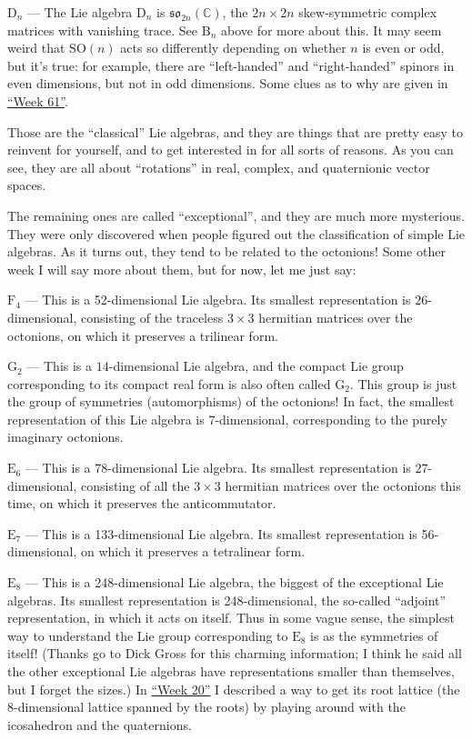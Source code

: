 \documentclass{article}
\begin{document}
\(\mathrm{D}_n\) --- The Lie algebra \(\mathrm{D}_n\) is
\(\mathfrak{so}_{2n}(\mathbb{C})\), the \(2n \times 2n\) skew-symmetric
complex matrices with vanishing trace. See \(\mathrm{B}_n\) above for
more about this. It may seem weird that \(\mathrm{SO}(n)\) acts so
differently depending on whether \(n\) is even or odd, but it's true:
for example, there are ``left-handed'' and ``right-handed'' spinors in
even dimensions, but not in odd dimensions. Some clues as to why are
given in \protect\hyperlink{week61}{``Week 61''}.

Those are the ``classical'' Lie algebras, and they are things that are
pretty easy to reinvent for yourself, and to get interested in for all
sorts of reasons. As you can see, they are all about ``rotations'' in
real, complex, and quaternionic vector spaces.

The remaining ones are called ``exceptional'', and they are much more
mysterious. They were only discovered when people figured out the
classification of simple Lie algebras. As it turns out, they tend to be
related to the octonions! Some other week I will say more about them,
but for now, let me just say:

\(\mathrm{F}_4\) --- This is a 52-dimensional Lie algebra. Its smallest
representation is \(26\)-dimensional, consisting of the traceless
\(3\times3\) hermitian matrices over the octonions, on which it
preserves a trilinear form.

\(\mathrm{G}_2\) --- This is a \(14\)-dimensional Lie algebra, and the
compact Lie group corresponding to its compact real form is also often
called \(\mathrm{G}_2\). This group is just the group of symmetries
(automorphisms) of the octonions! In fact, the smallest representation
of this Lie algebra is 7-dimensional, corresponding to the purely
imaginary octonions.

\(\mathrm{E}_6\) --- This is a 78-dimensional Lie algebra. Its smallest
representation is \(27\)-dimensional, consisting of all the \(3\times3\)
hermitian matrices over the octonions this time, on which it preserves
the anticommutator.

\(\mathrm{E}_7\) --- This is a 133-dimensional Lie algebra. Its smallest
representation is 56-dimensional, on which it preserves a tetralinear
form.

\(\mathrm{E}_8\) --- This is a 248-dimensional Lie algebra, the biggest
of the exceptional Lie algebras. Its smallest representation is
248-dimensional, the so-called ``adjoint'' representation, in which it
acts on itself. Thus in some vague sense, the simplest way to understand
the Lie group corresponding to \(\mathrm{E}_8\) is as the symmetries of
itself! (Thanks go to Dick Gross for this charming information; I think
he said all the other exceptional Lie algebras have representations
smaller than themselves, but I forget the sizes.) In
\protect\hyperlink{week20}{``Week 20''} I described a way to get its
root lattice (the \(8\)-dimensional lattice spanned by the roots) by
playing around with the icosahedron and the quaternions.
\end{document}
